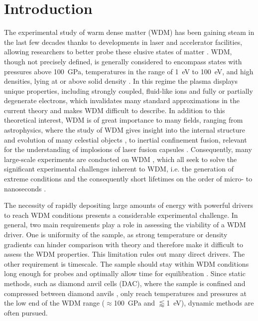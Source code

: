 \chapter{Introduction}

The experimental study of warm dense matter (WDM) has 
been gaining steam in the last few decades thanks to 
developments in laser and accelerator 
facilities, allowing researchers to better probe 
these elusive states of matter \citep{riley2021warm, 
falk2018experimental, graziani2014frontiers}. WDM, 
though not precisely defined, is generally considered 
to encompass states with pressures above 
\SI{100}{\giga\pascal}, temperatures in the range of 
\SI{1}{\electronvolt} to \SI{100}{\electronvolt}, and 
high densities, lying at or above solid density 
\citep{riley2021warm}. In this regime the plasma 
displays unique properties, including strongly 
coupled, fluid-like ions and fully or partially 
degenerate electrons, which invalidates many standard 
approximations in the current theory 
\citep{falk2018experimental} and makes WDM difficult 
to 
describe. In addition to this theoretical interest, 
WDM is of great importance to 
many fields, ranging from astrophysics, where the 
study of WDM gives insight into the internal 
structure and evolution of many celestial objects 
\citep{koenig2005progress,collins1998measurements, 
tahir2022planetary}, to inertial confinement fusion, 
relevant for the 
understanding of implosions of laser fusion capsules 
\citep{riley2021warm, falk2018experimental}. 
Consequently, many large-scale 
experiments are conducted on WDM 
\citep{bagnoud2010commissioning, 
millot2019nanosecond, altarelli2011european}, which 
all seek to solve the significant experimental 
challenges inherent to WDM, i.e. the generation of 
extreme conditions 
\citep{koenig2005progress,falk2018experimental} and 
the consequently short lifetimes on 
the order of micro- to nanoseconds 
\citep{riley2021warm}. 

The necessity of rapidly depositing large amounts of 
energy with powerful drivers to reach WDM conditions presents a 
considerable experimental challenge. In general, two main requirements play a role in assessing the viability of a WDM driver. One is uniformity of the sample, as strong temperature or density gradients can hinder comparison with theory and therefore make it difficult to assess the WDM properties. This limitation rules out many direct drivers. The other requirement is timescale. The sample should stay within WDM conditions long enough for probes and optimally allow time for equilibration \citep{riley2017generation}. Since static methods, such as diamond anvil 
cells (DAC), where the sample is confined and compressed between diamond anvils \citep{dubrovinsky2000situ}, only reach temperatures and pressures at the low end of the WDM range ($\approx$\SI{100}{\giga\pascal} and $\lessapprox$\SI{1}{\electronvolt}), dynamic methods are often pursued. 

